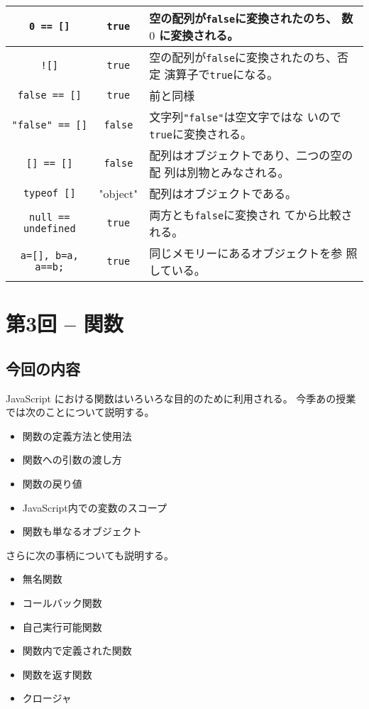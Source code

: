 \documentclass[a4j]{jarticle}
\begin{document}
\begin{center}
\begin{tabular}{|>{\Rule}c|c|m{}|}
  \verb+0 == []+& \verb+true+& 空の配列が\verb+false+に変換されたのち、
	  数 $0$ に変換される。\\ \hline
  \verb+![]+& \verb+true+& 空の配列が\verb+false+に変換されたのち、否定
	  演算子で\verb+true+になる。\\ \hline
  \verb+false == []+& \verb+true+& 前と同様\\ \hline
  \verb+"false" == []+& \verb+false+& 文字列\verb+"false"+は空文字ではな
	  いので\verb+true+に変換される。\\ \hline
  \verb+[] == []+& \verb+false+& 配列はオブジェクトであり、二つの空の配
	  列は別物とみなされる。\\ \hline
  \verb+typeof []+& "object"& 配列はオブジェクトである。\\ \hline
  \verb+null == undefined+& \verb+true+ & 両方とも\verb+false+に変換され
	  てから比較される。\\ \hline
  \verb+a=[], b=a, a==b;+&\verb+true+&同じメモリーにあるオブジェクトを参
	  照している。\\ \hline
 \end{tabular}
\end{center}
\newpage
\section{第3回 -- 関数}
\subsection{今回の内容}
JavaScript における関数はいろいろな目的のために利用される。
今季あの授業では次のことについて説明する。
\begin{itemize}
 \item 関数の定義方法と使用法
 \item 関数への引数の渡し方
 \item 関数の戻り値
 \item JavaScript内での変数のスコープ
 \item 関数も単なるオブジェクト
\end{itemize}
さらに次の事柄についても説明する。
\begin{itemize}
 \item 無名関数
 \item コールバック関数
 \item 自己実行可能関数
 \item 関数内で定義された関数
 \item 関数を返す関数
 \item クロージャ
\end{itemize}
\end{document}
